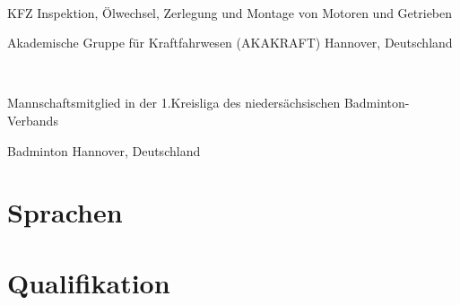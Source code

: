 \documentclass[11pt,a4paper,sans]{moderncv}
\begin{document}
{\ \parbox[t]{12cm}{KFZ Inspektion, Ölwechsel, Zerlegung und Montage von Motoren und Getrieben}}
{Akademische Gruppe für Kraftfahrwesen (AKAKRAFT)}
{Hannover, Deutschland}
{}
{}

{\ \parbox[t]{10cm}{Mannschaftsmitglied in der 1.Kreisliga des niedersächsischen Badminton-Verbands}}
{Badminton}
{Hannover, Deutschland}
{}
{}

\section{\textbf{Sprachen}}

\section{\textbf{Qualifikation}}
\end{document}
